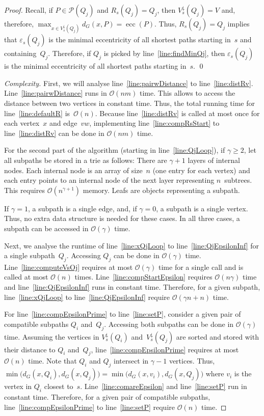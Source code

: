 \documentclass[10pt]{llncs}
\newcommand{\calO}{\mathcal{O}}
\newcommand{\calP}{\mathcal{P}}
\DeclareMathOperator{\ecc}{ecc}
\begin{document}
\begin{proof}
Recall, if $P \in \calP(Q_j)$ and $R_s(Q_j) = Q_j$, then $V^\downarrow_s(Q_j) = V$ and, therefore, $\max_{x \in V^\downarrow_s(Q_j)} d_G(x, P) = \ecc(P)$.
Thus, $R_s(Q_j) = Q_j$ implies that $\varepsilon_s(Q_j)$ is the minimal eccentricity of all shortest paths starting in~$s$ and containing~$Q_j$.
Therefore, if $Q_j$ is picked by line~\ref{line:findMinQj}, then $\varepsilon_s(Q_j)$ is the minimal eccentricity of all shortest paths starting in~$s$.
\qed
\end{proof}

\begin{proof}
    [Complexity]
First, we will analyse line~\ref{line:pairwDistance} to line~\ref{line:distRv}.
Line~\ref{line:pairwDistance} runs in $\calO(nm)$ time.
This allows to access the distance between two vertices in constant time.
Thus, the total running time for line~\ref{line:defaultR} is~$\calO(n)$.
Because line~\ref{line:distRv} is called at most once for each vertex~$x$ and edge~$vw$, implementing line~\ref{line:compRsStart} to line~\ref{line:distRv} can be done in $\calO(nm)$ time.

For the second part of the algorithm (starting in line~\ref{line:QjLoop}), if $\gamma \geq 2$, let all subpaths be stored in a trie as follows:
There are $\gamma + 1$ layers of internal nodes.
Each internal node is an array of size~$n$ (one entry for each vertex) and each entry points to an internal node of the next layer representing $n$~subtrees.
This requires $\calO(n^{\gamma + 1})$ memory.
Leafs are objects representing a subpath.

If $\gamma = 1$, a subpath is a single edge, and, if $\gamma = 0$, a subpath is a single vertex.
Thus, no extra data structure is needed for these cases.
In all three cases, a subpath can be accessed in $\calO(\gamma)$ time.

Next, we analyse the runtime of line~\ref{line:xQjLoop} to line~\ref{line:QjEpsilonInf} for a single subpath~$Q_j$.
Accessing $Q_j$ can be done in $\calO(\gamma)$ time.
Line~\ref{line:computeVsOj} requires at most $\calO(\gamma)$ time for a single call and is called at most $\calO(n)$ times.
Line~\ref{line:compStartEpsilon} requires $\calO(n\gamma)$ time and line~\ref{line:QjEpsilonInf} runs in constant time.
Therefore, for a given subpath, line~\ref{line:xQjLoop} to line~\ref{line:QjEpsilonInf} require $\calO(\gamma n + n)$ time.

For line~\ref{line:compEpsilonPrime} to line~\ref{line:setP}, consider a given pair of compatible subpaths $Q_i$ and~$Q_j$.
Accessing both subpaths can be done in $\calO(\gamma)$ time.
Assuming the vertices in $V^\downarrow_s(Q_i)$ and~$V^\downarrow_s(Q_j)$ are sorted and stored with their distance to $Q_i$ and~$Q_j$, line~\ref{line:compEpsilonPrime} requires at most $\calO(n)$ time.
Note that $Q_i$ and $Q_j$ intersect in $\gamma - 1$ vertices.
Thus, $\min \big( d_G(x, Q_i), d_G(x, Q_j) \big) =  \min \big( d_G(x, v_i), d_G(x, Q_j) \big)$ where $v_i$ is the vertex in $Q_i$ closest to~$s$.
Line~\ref{line:comareEpsilon} and line~\ref{line:setP} run in constant time.
Therefore, for a given pair of compatible subpaths, line~\ref{line:compEpsilonPrime} to line~\ref{line:setP} require $\calO(n)$ time.


\end{proof}
\end{document}
